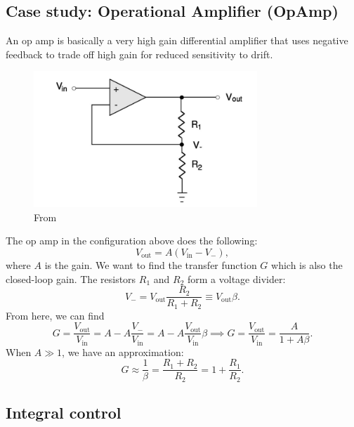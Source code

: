 \documentclass{book}
\theoremstyle{definition}
\newcommand{\f}[2]{\frac{#1}{#2}}
\begin{document}
\subsection*{Case study: Operational Amplifier (OpAmp)}


An op amp is basically a very high gain differential amplifier that uses negative feedback to trade off high gain for reduced sensitivity to drift. 

\begin{figure}[!htb]
	\centering
	\includegraphics[width=0.75\textwidth]{images/op-amp}
	\caption{From \cite{bechhoefer2005feedback}}
\end{figure}

The op amp in the configuration above does the following:
\begin{equation*}
V_\text{out} = A(V_\text{in} - V_-),
\end{equation*}
where $A$ is the gain. We want to find the transfer function $G$ which is also the closed-loop gain. The resistors $R_1$ and $R_2$ form a voltage divider:
\begin{equation*}
V_- = V_\text{out} \f{R_2}{R_1 + R_2} \equiv V_\text{out} \beta.
\end{equation*}
From here, we can find 
\begin{equation*}
G = \f{V_\text{out}}{V_\text{in}} = A - A\f{V_-}{V_\text{in}} = A - A\f{V_\text{out}}{V_\text{in}} \beta \implies G = \f{V_\text{out}}{V_\text{in}} = \f{A}{1+A\beta}. 
\end{equation*}
When $A \gg 1$, we have an approximation:
\begin{equation*}
G \approx \f{1}{\beta} = \f{R_1 + R_2}{R_2} = 1 + \f{R_1}{R_2}. 
\end{equation*}








\subsection*{Integral control}
\end{document}
